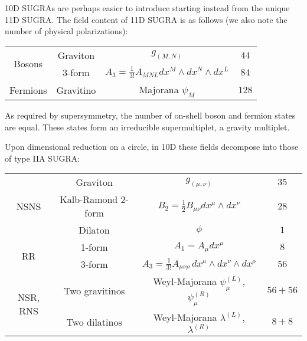 10D SUGRAs are perhaps easier to introduce starting instead from the unique 11D SUGRA. The field content of 11D SUGRA is as follows (we also note the number of physical polarizations):



\begin{center}
	\begin{tabular}{|c|c|c|c|}
		\hline
		\multirow{2}{*}{Bosons} &
		Graviton	& $g_{(M,N)}$ 							& $44$\\
		&3-form		& $A_3 = \frac{1}{3!} A_{MNL} dx^M \wedge dx^N \wedge dx^L$	& $84$\\
		\hline \hline 
		
		Fermions & Gravitino	& Majorana $\psi_M$ 						& $128$\\
		\hline
	\end{tabular}
\end{center}

As required by supersymmetry, the number of on-shell boson and fermion states are equal. These states form an irreducible supermultiplet, a gravity multiplet.

Upon dimensional reduction on a circle, in 10D these fields decompose into those of type IIA SUGRA:

%

\begin{center}
	\begin{tabular}{|c|c|c|c|}
		\hline
		\multirow{3}{*}{NSNS} 
	&	Graviton	& $g_{(\mu,\nu)}$ 							& $35$\\
	&	Kalb-Ramond 2-form & $B_2 = \frac{1}{2} B_{\mu\nu} dx^\mu \wedge dx^\nu$ & $28$ \\
	&	Dilaton & $\phi$ & $1$ \\
		\hline \hline
		\multirow{2}{*}{RR} 
	&	1-form		& $A_1 = A_{\mu} dx^\mu$ & $8$\\
	&	3-form		& $A_3 = \frac{1}{3!} A_{\mu\nu\rho} \, dx^\mu \wedge dx^\nu \wedge dx^\rho$ & $56$\\
		\hline \hline 
		\multirow{2}{*}{NSR, RNS}
	&	Two gravitinos	& Weyl-Majorana $\psi_\mu^{(L)}$, $\psi_\mu^{(R)}$ 	& $56+56$\\
	&	Two dilatinos	& Weyl-Majorana $\lambda^{(L)}$, $\lambda^{(R)}$ 	& $8+8$\\
		\hline
	\end{tabular}
\end{center}

